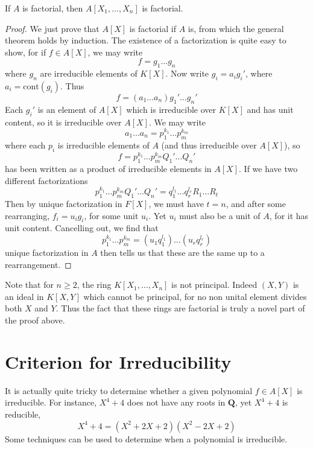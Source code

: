 \begin{corollary}
    If $A$ is factorial, then $A[X_1, \dots, X_n]$ is factorial.
\end{corollary}
\begin{proof}
    We just prove that $A[X]$ is factorial if $A$ is, from which the general theorem holds by induction. The existence of a factorization is quite easy to show, for if $f \in A[X]$, we may write
    \[ f = g_1 \dots g_n \]
    where $g_n$ are irreducible elements of $K[X]$. Now write $g_i = a_i g_i'$, where $a_i = \text{cont}(g_i)$. Thus
    \[ f = (a_1 \dots a_n) g_1' \dots g_n' \]
    Each $g_i'$ is an element of $A[X]$ which is irreducible over $K[X]$ and has unit content, so it is irreducible over $A[X]$. We may write
    \[ a_1 \dots a_n = p_1^{k_1} \dots p_m^{k_m} \]
    where each $p_i$ is irreducible elements of $A$ (and thus irreducible over $A[X]$), so
    \[ f = p_1^{k_1} \dots p_m^{k_m} Q_1' \dots Q_n' \]
    has been written as a product of irreducible elements in $A[X]$. If we have two different factorizations
    \[ p_1^{k_1} \dots p_m^{k_m} Q_1' \dots Q_n' = q_1^{l_1} \dots q_r^{l_r} R_1 \dots R_t \]
    Then by unique factorization in $F[X]$, we must have $t = n$, and after some rearranging, $f_i = u_i g_i$, for some unit $u_i$. Yet $u_i$ must also be a unit of $A$, for it has unit content. Cancelling out, we find that
    \[ p_1^{k_1} \dots p_m^{k_m} = (u_1 q_1^{l_1}) \dots (u_r q_r^{l_r}) \]
    unique factorization in $A$ then tells us that these are the same up to a rearrangement.
\end{proof}

Note that for $n \geq 2$, the ring $K[X_1, \dots, X_n]$ is not principal. Indeed $(X,Y)$ is an ideal in $K[X,Y]$ which cannot be principal, for no non unital element divides both $X$ and $Y$. Thus the fact that these rings are factorial is truly a novel part of the proof above.





\section{Criterion for Irreducibility}

It is actually quite tricky to determine whether a given polynomial $f \in A[X]$ is irreducible. For instance, $X^4 + 4$ does not have any roots in $\mathbf{Q}$, yet $X^4 + 4$ is reducible,
%
\[ X^4 + 4 = (X^2 + 2X + 2)(X^2 - 2X + 2) \]
%
Some techniques can be used to determine when a polynomial is irreducible.

